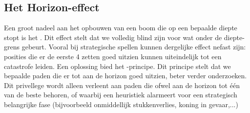 \subsection{Het Horizon-effect} 
Een groot nadeel aan het opbouwen van een boom die op een bepaalde diepte stopt is het . Dit effect stelt dat we volledig blind zijn voor wat onder de diepte-grens gebeurt. Vooral bij strategische spellen kunnen dergelijke effect nefast zijn: posities die er de eerste 4 zetten goed uitzien kunnen uiteindelijk tot een catastrofe leiden. Een oplossing bied het -principe. Dit principe stelt dat we bepaalde paden die er tot aan de horizon goed uitzien, beter verder onderzoeken. Dit privellege wordt alleen verleent aan paden die ofwel aan de horizon tot \'e\'en van de beste behoren, of waarbij een heuristiek alarmeert voor een strategisch belangrijke fase (bijvoorbeeld onmiddellijk stukkenverlies, koning in gevaar,...)
